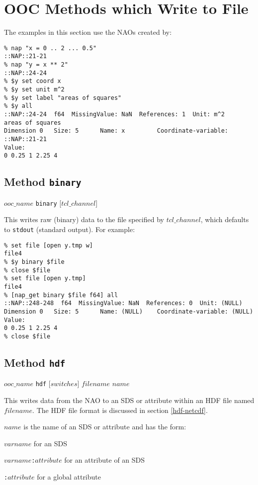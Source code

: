 
\section{OOC Methods which Write to File}

The examples in this section use the NAOs created by:
  \begin{verbatim}
% nap "x = 0 .. 2 ... 0.5"
::NAP::21-21
% nap "y = x ** 2"
::NAP::24-24
% $y set coord x
% $y set unit m^2
% $y set label "areas of squares"
% $y all
::NAP::24-24  f64  MissingValue: NaN  References: 1  Unit: m^2
areas of squares
Dimension 0   Size: 5      Name: x         Coordinate-variable: ::NAP::21-21
Value:
0 0.25 1 2.25 4
\end{verbatim}

\subsection{Method \texttt{binary}}
    \label{ooc-write-binary}

  $ooc\_name$ \texttt{binary} [$tcl\_channel$]

This writes raw (binary) data to the file specified by 
  $tcl\_channel$, which defaults to 
  \texttt{stdout} (standard output). For example:
  \begin{verbatim}
% set file [open y.tmp w]
file4
% $y binary $file
% close $file
% set file [open y.tmp]
file4
% [nap_get binary $file f64] all
::NAP::248-248  f64  MissingValue: NaN  References: 0  Unit: (NULL)
Dimension 0   Size: 5      Name: (NULL)    Coordinate-variable: (NULL)
Value:
0 0.25 1 2.25 4
% close $file
\end{verbatim}

\subsection{Method \texttt{hdf}}
    \label{ooc-write-hdf}

  $ooc\_name$ \texttt{hdf} [$switches$]  $filename$ $name$

This writes data from the NAO to an SDS or attribute within an HDF
  file named 
  $filename$.
The HDF file format is discussed in section \ref{hdf-netcdf}.

  $name$ is the name of an SDS or attribute and has the
  form:
\begin{bullets}
    \item $varname$ for an SDS
    \item $varname$\texttt{:}$attribute$ for an attribute of an SDS
    \item \texttt{:}$attribute$ for a global attribute
\end{bullets}
  

